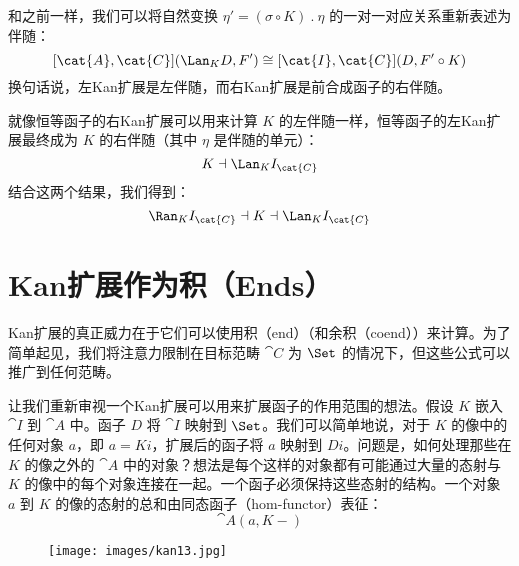 和之前一样，我们可以将自然变换 $\eta' = (\sigma \circ K)\ .\ \eta$ 的一对一对应关系重新表述为伴随：
\[[\cat{A}, \cat{C}](\Lan_{K}D, F') \cong [\cat{I}, \cat{C}](D, F' \circ K)\]
换句话说，左Kan扩展是左伴随，而右Kan扩展是前合成函子的右伴随。

就像恒等函子的右Kan扩展可以用来计算 $K$ 的左伴随一样，恒等函子的左Kan扩展最终成为 $K$ 的右伴随（其中 $\eta$ 是伴随的单元）：
\[K \dashv \Lan_{K}I_{\cat{C}}\]
结合这两个结果，我们得到：
\[\Ran_{K}I_{\cat{C}} \dashv K \dashv \Lan_{K}I_{\cat{C}}\]

\section{Kan扩展作为积（Ends）}

Kan扩展的真正威力在于它们可以使用积（end）（和余积（coend））来计算。为了简单起见，我们将注意力限制在目标范畴 $\cat{C}$ 为 $\Set$ 的情况下，但这些公式可以推广到任何范畴。

让我们重新审视一个Kan扩展可以用来扩展函子的作用范围的想法。假设 $K$ 嵌入 $\cat{I}$ 到 $\cat{A}$ 中。函子 $D$ 将 $\cat{I}$ 映射到 $\Set$。我们可以简单地说，对于 $K$ 的像中的任何对象 $a$，即 $a = K i$，扩展后的函子将 $a$ 映射到 $D i$。问题是，如何处理那些在 $K$ 的像之外的 $\cat{A}$ 中的对象？想法是每个这样的对象都有可能通过大量的态射与 $K$ 的像中的每个对象连接在一起。一个函子必须保持这些态射的结构。一个对象 $a$ 到 $K$ 的像的态射的总和由同态函子（hom-functor）表征：
\[\cat{A}(a, K -)\]

\begin{figure}[H]
  \centering
  \texttt{[image: images/kan13.jpg]}
\end{figure}

